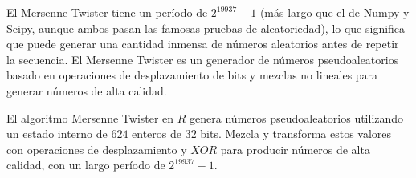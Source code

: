 \begin{itemize}
El Mersenne Twister tiene un período de $2^{19937}-1$ (más largo que el de Numpy y Scipy, aunque ambos pasan las famosas pruebas de aleatoriedad), lo que significa que puede generar una cantidad inmensa de números aleatorios antes de repetir la secuencia. El Mersenne Twister es un generador de números pseudoaleatorios basado en operaciones de desplazamiento de bits y mezclas no lineales para generar números de alta calidad.

El algoritmo Mersenne Twister en $R$ genera números pseudoaleatorios utilizando un estado interno de $624$ enteros de $32$ bits. Mezcla y transforma estos valores con operaciones de desplazamiento y $XOR$ para producir números de alta calidad, con un largo período de $2^{19937}-1$.
\end{itemize}